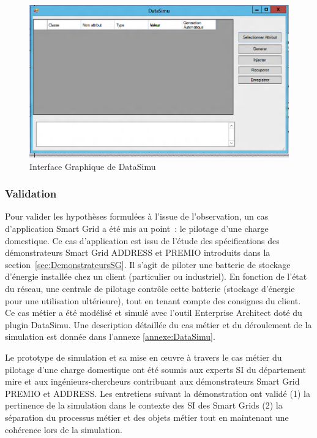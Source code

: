 \begin{figure}[!ht]
 \begin{center}
  \includegraphics[width=1\textwidth]{figures/6_methodologie/data_simu.png}
 \end{center}
 \caption{Interface Graphique de DataSimu}
 \label{fig:data_simu}
\end{figure}
				
			\subsubsection{Validation}
			Pour valider les hypothèses formulées à l'issue de l'observation, un cas 
d'application Smart Grid a été mis au point~: le pilotage d'une charge 
domestique. Ce cas d'application est issu de l'étude des spécifications des 
démonstrateurs Smart Grid ADDRESS et PREMIO introduits dans la 
section~\ref{sec:DemonstrateursSG}. Il s'agit de piloter une batterie de 
stockage d'énergie installée chez un client (particulier ou industriel). En 
fonction de l'état du réseau, une centrale de pilotage contrôle cette batterie 
(stockage d'énergie pour une utilisation ultérieure), tout en tenant compte des 
consignes du client. Ce cas métier a été modélisé et simulé avec l'outil 
Enterprise Architect doté du plugin DataSimu. Une description détaillée du cas 
métier et du déroulement de la simulation est donnée dans l'annexe 
\ref{annexe:DataSimu}. 
			
			Le prototype de simulation et sa mise en œuvre à travers le cas métier du 
pilotage d'une charge domestique ont été soumis aux experts SI du département 
\gls{mire} et aux ingénieurs-chercheurs contribuant aux démonstrateurs Smart 
Grid PREMIO et ADDRESS. Les entretiens suivant la démonstration ont validé (1) 
la pertinence de la simulation dans le contexte des SI des Smart Grids (2) la 
séparation du processus métier et des objets métier tout en maintenant une 
cohérence lors de la simulation. 
			
